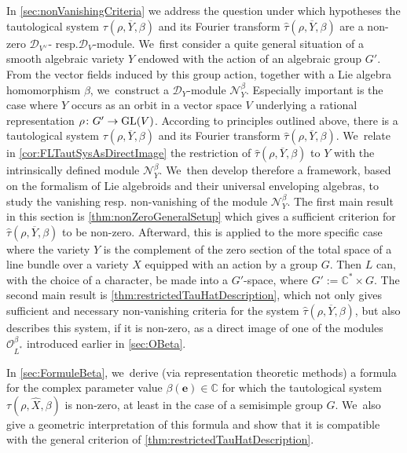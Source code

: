 \documentclass[11pt]{article}
\newcommand{\resp}{resp.\xspace}
\let\mathds\mathbb
\newcommand{\bme}{{\boldsymbol{e}}}
\newcommand{\dC}{{\mathds C}}\let\C\dC
\newcommand{\cO}{\mathcal{O}}\let\O\cO
\DeclareMathOperator{\GL}{\textup{GL}}
\begin{document}
In \cref{sec:nonVanishingCriteria} we address the question under which hypotheses the tautological system
$\tau(\rho,\overline{Y},\beta)$ and its Fourier transform $\hat{\tau}(\rho,\overline{Y},\beta)$ are a non-zero $\mathscr{D}_{V^\vee}$- \resp $\mathscr{D}_V$\nobreakdash-mod\-ule. We~first consider a quite general situation of a smooth algebraic variety $Y$ endowed with the action of an algebraic group $G'$. From the vector fields induced by this group action, together with a Lie algebra homomorphism $\beta$, we~construct a $\mathscr{D}_Y$\nobreakdash-mod\-ule $\mathscr{N}_Y^\beta$. Especially important is the case where $Y$ occurs as an orbit in a vector space $V$ underlying a rational representation $\rho\colon G'\to \GL(V)$. According to principles outlined above, there is a tautological system $\tau(\rho,\overline{Y},\beta)$ and its Fourier transform $\hat{\tau}(\rho,\overline{Y},\beta)$. We~relate in \cref{cor:FLTautSysAsDirectImage} the restriction of $\hat{\tau}(\rho,\overline{Y},\beta)$ to $Y$ with the intrinsically defined module $\mathscr{N}_Y^\beta$. We~then develop therefore a framework, based on the formalism of Lie algebroids and their universal enveloping algebras, to study the vanishing \resp non-vanishing of the module $\mathscr{N}_Y^\beta$. The first main result in this section is \cref{thm:nonZeroGeneralSetup} which gives a sufficient criterion for $\hat{\tau}(\rho, \overline{Y},\beta)$ to be non-zero. Afterward, this is applied to the more specific case where the variety $Y$ is the complement of the zero section of the total space of a line bundle over a variety $X$ equipped with an action by a group $G$. Then $L$ can, with the choice of a character, be made into a $G'$-space, where $G':=\dC^*\times G$. The second main result is \cref{thm:restrictedTauHatDescription}, which not only gives sufficient and necessary non-vanishing criteria for the
system $\hat{\tau}(\rho,\overline{Y},\beta)$, but also describes this system, if it is non-zero, as a direct image of one of the modules $\cO_{L^*}^\beta$ introduced earlier in \cref{sec:OBeta}.

In \cref{sec:FormuleBeta}, we~derive (via representation theoretic methods) a formula for the complex parameter value $\beta(\bme)\in \dC$
for which the tautological system $\tau(\rho, \hat{X}, \beta)$ is non-zero, at least in the case of a semisimple group $G$. We~also give a geometric interpretation of this formula and show that it is compatible with the general criterion of \cref{thm:restrictedTauHatDescription}.
\end{document}

